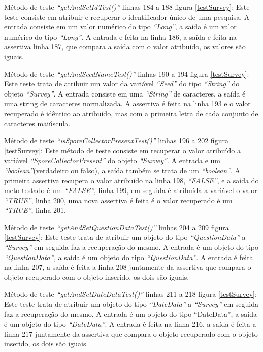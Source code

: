 Método de teste \textit{“getAndSetIdTest()”} linhas 184 a 188 figura \ref{testSurvey}: Este teste consiste em atribuir e recuperar o identificador único de uma pesquisa. A entrada consiste em um valor numérico do tipo \textit{“Long”}, a saída é um valor numérico do tipo \textit{“Long”}. A entrada e feita na linha 186, a saída e feita na assertiva linha 187, que compara a saída com o valor atribuído, os valores são iguais.

Método de teste \textit{“getAndSeedNameTest()”} linhas 190 a 194 figura \ref{testSurvey}: Este teste trata de atribuir um valor da variável \textit{“Seed”} do tipo \textit{“String”} do objeto \textit{“Survey”}. A entrada consiste em uma \textit{“String”} de caracteres, a saída é uma string de caracteres normalizada. A assertiva é feita na linha 193 e o valor recuperado é idêntico ao atribuído, mas com a primeira letra de cada conjunto de caracteres maiúscula.

Método de teste \textit{“isSporeCollectorPresentTest()”} linhas 196 a 202 figura \ref{testSurvey}: Este método de teste consiste em recuperar o valor atribuído a variável \textit{“SporeCollectorPresent” }do objeto \textit{“Survey”}. A entrada e um \textit{“boolean”}(verdadeiro ou falso), a saída também se trata de um \textit{“boolean”}. A primeira assertiva recupera o valor atribuído na linha 198, \textit{“FALSE”}, e a saída do meto testado é um \textit{“FALSE”}, linha 199, em seguida é atribuída a variável o valor \textit{“TRUE”}, linha 200, uma nova assertiva é feita é o valor recuperado é um \textit{“TRUE”}, linha 201.

Método de teste \textit{“getAndSetQuestionDataTest()”} linhas 204 a 209 figura \ref{testSurvey}: Este teste trata de atribuir um objeto do tipo \textit{“QuestionData” }a \textit{“Survey”} em seguida faz a recuperação do mesmo. A entrada é um objeto do tipo \textit{“QuestionData”,} a saída é um objeto do tipo\textit{ “QuestionData”}. A entrada é feita na linha 207, a saída é feita a linha 208 juntamente da assertiva que compara o objeto recuperado com o objeto inserido, os dois são iguais.

Método de teste \textit{“getAndSetDateDataTest()”} linhas 211 a 218 figura \ref{testSurvey}: Este teste trata de atribuir um objeto do tipo \textit{“DateData”} a \textit{“Survey”} em seguida faz a recuperação do mesmo. A entrada é um objeto do tipo “DateData”, a saída é um objeto do tipo \textit{“DateData”}. A entrada é feita na linha 216, a saída é feita a linha 217 juntamente da assertiva que compara o objeto recuperado com o objeto inserido, os dois são iguais.

